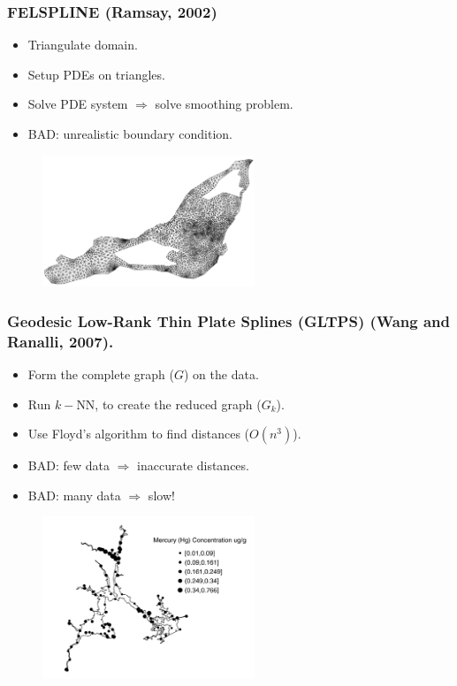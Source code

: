 \documentclass[ignorenonframetext]{beamer} %
\newcommand{\bi}{\begin{itemize}}
\newcommand{\ei}{\end{itemize}}
\begin{document}
\begin{frame}
	\frametitle{FELSPLINE (Ramsay, 2002)}
	\bi
             \item Triangulate domain.
             \item Setup PDEs on triangles.
             \item Solve PDE system $\Rightarrow$ solve smoothing problem.
             \item BAD: unrealistic boundary condition.
         \ei
         \begin{figure}
         		\centering
        \includegraphics[width=2.5in]{figs/ramsaytriangulation.png}
	\end{figure}        
\end{frame}

\begin{frame}
	\frametitle{Geodesic Low-Rank  Thin Plate Splines (GLTPS) (Wang and Ranalli, 2007).}
	\bi
             \item Form the complete graph ($G$) on the data.
             \item Run $k-$NN, to create the reduced graph ($G_k$).
             \item Use Floyd's algorithm to find distances ($O(n^3)$).
             \item BAD: few data $\Rightarrow$ inaccurate distances.
             \item BAD: many data $\Rightarrow$ slow!
         \ei
         \begin{figure}
         		\centering
                 \includegraphics[width=2.5in]{figs/wr-river.png}
	\end{figure}
\end{frame}
\end{document}
